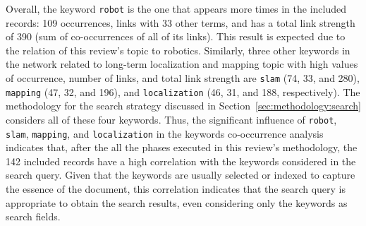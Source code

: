 Overall, the keyword \texttt{robot} is the one that appears more times in the included records: 109 occurrences, links with 33 other terms, and has a total link strength of 390 (sum of co-occurrences of all of its links). This result is expected due to the relation of this review's topic to robotics.
Similarly, three other keywords in the network related to long-term localization and mapping topic with high values of occurrence, number of links, and total link strength are \texttt{slam} (74, 33, and 280), \texttt{mapping} (47, 32, and 196), and \texttt{localization} (46, 31, and 188, respectively). The methodology for the search strategy discussed in Section~\ref{sec:methodology:search} considers all of these four keywords. Thus, the significant influence of \texttt{robot}, \texttt{slam}, \texttt{mapping}, and \texttt{localization} in the keywords co-occurrence analysis indicates that, after the all the phases executed in this review's methodology, the 142 included records have a high correlation with the keywords considered in the search query. Given that the keywords are usually selected or indexed to capture the essence of the document, this correlation indicates that the search query is appropriate to obtain the search results, even considering only the keywords as search fields.

